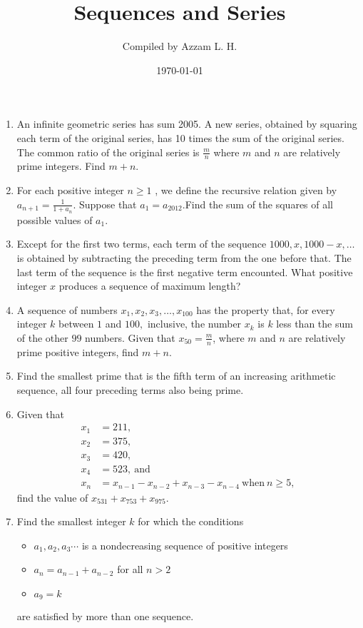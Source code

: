 \documentclass{article}
\title{Sequences and Series}
\author{Compiled by Azzam L. H.}
\date{\today}
\begin{document}
\maketitle
 \begin{enumerate}
    \item An infinite geometric series has sum 2005. A new series, obtained by squaring each term of the original series, has 10 times the sum of the original series. The common ratio of the original series is $\frac mn$ where $m$ and $n$ are relatively prime integers. Find $m+n.$

    \item For each positive integer $n \geq 1$ , we define the recursive relation given by $a_{n+1} = \frac {1}{1+a_{n}}$. Suppose that $a_{1} = a_{2012}$.Find the sum of the squares of all possible values of $a_{1}$.

    \item Except for the first two terms, each term of the sequence $1000, x, 1000 - x,\ldots$ is obtained by subtracting the preceding term from the one before that. The last term of the sequence is the first negative term encounted. What positive integer $x$ produces a sequence of maximum length?

    \item A sequence of numbers $x_{1},x_{2},x_{3},\ldots,x_{100}$ has the property that, for every integer $k$ between $1$ and $100,$ inclusive, the number $x_{k}$ is $k$ less than the sum of the other $99$ numbers. Given that $x_{50} = \frac{m}{n}$, where $m$ and $n$ are relatively prime positive integers, find $m + n$.

    \item Find the smallest prime that is the fifth term of an increasing arithmetic sequence, all four preceding terms also being prime.

    \item Given that\begin{align*}x_{1}&=211,\\ x_{2}&=375,\\ x_{3}&=420,\\ x_{4}&=523,\ \text{and}\\ x_{n}&=x_{n-1}-x_{n-2}+x_{n-3}-x_{n-4}\ \text{when}\ n\geq5, \end{align*}find the value of $x_{531}+x_{753}+x_{975}$.

    \item Find the smallest integer $k$ for which the conditions
        \begin{itemize}
            \item $a_1,a_2,a_3\cdots$ is a nondecreasing sequence of positive integers
            \item $a_n=a_{n-1}+a_{n-2}$ for all $n>2$
            \item $a_9=k$
        \end{itemize}
    are satisfied by more than one sequence.


\end{enumerate}
\end{document}
